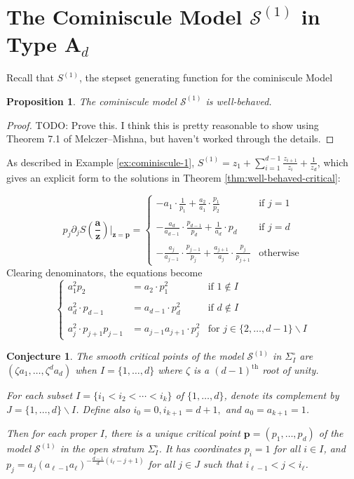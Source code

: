 \documentclass[A4,12pt]{article}
\newcommand{\<}{\left\langle}
\renewcommand{\>}{\right\rangle}
\newcommand{\steps}{\mathcal{S}}
\newcommand{\z}{\mathbf{z}}
\renewcommand{\a}{\mathbf{a}}
\newcommand{\ts}{\textstyle}
\newtheorem{proposition}[theorem]{Proposition}
\newtheorem{conjecture}[theorem]{Conjecture}
\theoremstyle{definition}
\theoremstyle{example}
\begin{document}
\section{The Cominiscule Model $\steps^{(1)}$ in Type A$_d$}

Recall that $S^{(1)}$, the stepset generating function for the cominiscule Model

\begin{proposition}
The cominiscule model $\steps^{(1)}$ is well-behaved.
\end{proposition}

\begin{proof}
TODO: Prove this. I think this is pretty reasonable to show using Theorem 7.1 of Melczer--Mishna, but haven't worked through the details.
\end{proof}

As described in Example \ref{ex:cominiscule-1}, $S^{(1)}=z_1 + \sum_{i=1}^{d-1} \frac{z_{i+1}}{z_i} + \frac{1}{z_d}$, which gives an explicit form to the solutions in Theorem \ref{thm:well-behaved-critical}:

\[
p_j \partial_j S({\ts\frac{\a}{\z}})\Big\vert_{\z=\mathbf{p}}
= \left\{ \begin{array}{ll}
-a_1\cdot \frac{1}{p_1} + \frac{a_2}{a_1}\cdot\frac{p_1}{p_2} & \text{if } j=1 \\~\\
-\frac{a_d}{a_{d-1}}\cdot \frac{p_{d-1}}{p_d} + \frac{1}{a_d}\cdot p_d &  \text{if } j=d \\~\\
-\frac{a_j}{a_{j-1}}\cdot \frac{p_{j-1}}{p_j} + \frac{a_{j+1}}{a_j}\cdot\frac{p_{j}}{p_{j+1}} & \text{otherwise}
\end{array} \right.
\]
Clearing denominators, the equations become
\[
\left\{ \begin{array}{lll}
a_1^2p_2 &= a_2\cdot p_1^2 & \text{if } 1\notin I \\~\\
a_d^2\cdot p_{d-1} &= a_{d-1}\cdot p_d^2 & \text{if } d\notin I \\~\\
a_j^2\cdot p_{j+1}p_{j-1} &= a_{j-1}a_{j+1}\cdot p_j^2 & \text{for } j\in \{2,\dots, d-1\}\smallsetminus I
\end{array} \right.
\]

\begin{conjecture}
The smooth critical points of the model $\steps^{(1)}$ in $\Sigma_I^\circ$ are $(\zeta a_1,\dots, \zeta^da_d)$ when $I=\{1,\dots, d\}$ where $\zeta$ is a $(d-1)^\text{th}$ root of unity. 

For each subset $I=\{i_1<i_2<\cdots< i_k\}$ of $\{1,\dots, d\}$, denote its complement by $J=\{1,\dots, d\}\smallsetminus I$. Define also $i_0=0, i_{k+1}=d+1,$ and $a_0=a_{k+1}=1$.

Then for each proper $I$, there is a unique critical point $\mathbf{p}=(p_1,\dots, p_d)$ of the model $\steps^{(1)}$ in the open stratum $\Sigma_I^\circ$. It has coordinates $p_i=1$ for all $i\in I$, and $p_j = a_j (a_{\ell-1} a_\ell)^{-\frac{d-1}{d}(i_\ell-j+1)}$ for all $j\in J$ such that $i_{\ell-1} < j < i_\ell$. 
\end{conjecture}
\end{document}
